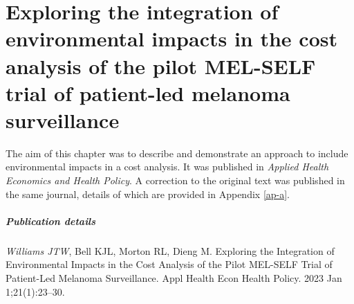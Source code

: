 \chapter{Exploring the integration of environmental impacts in the cost analysis of the pilot MEL-SELF trial of patient-led melanoma surveillance}
\label{ch-3}

The aim of this chapter was to describe and demonstrate an approach to include environmental impacts in a cost analysis. It was published in \textit{Applied Health Economics and Health Policy}. A correction to the original text was published in the same journal, details of which are provided in Appendix \ref{ap-a}.

\paragraph*{Publication details}
\textit{Williams JTW}, Bell KJL, Morton RL, Dieng M. Exploring the Integration of Environmental Impacts in the Cost Analysis of the Pilot MEL-SELF Trial of Patient-Led Melanoma Surveillance. Appl Health Econ Health Policy. 2023 Jan 1;21(1):23–30. 















